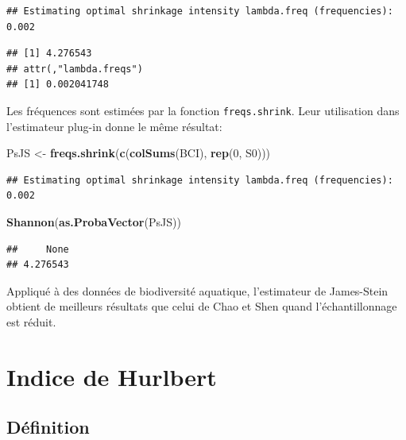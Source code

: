 \documentclass[
  11pt,
  french,
  a4paper,
  extrafontsizes,onecolumn,openright
  ]{memoir}
\newenvironment{Shaded}{\begin{snugshade}}{\end{snugshade}}
\newcommand{\DecValTok}[1]{\textcolor[rgb]{0.00,0.00,0.81}{#1}}
\newcommand{\KeywordTok}[1]{\textcolor[rgb]{0.13,0.29,0.53}{\textbf{#1}}}
\newcommand{\NormalTok}[1]{#1}
\newcommand{\StringTok}[1]{\textcolor[rgb]{0.31,0.60,0.02}{#1}}
\begin{document}
\begin{verbatim}
## Estimating optimal shrinkage intensity lambda.freq (frequencies): 0.002
\end{verbatim}

\begin{verbatim}
## [1] 4.276543
## attr(,"lambda.freqs")
## [1] 0.002041748
\end{verbatim}

\normalsize

Les fréquences sont estimées par la fonction \texttt{freqs.shrink}.
Leur utilisation dans l'estimateur plug-in donne le même résultat:

\scriptsize

\begin{Shaded}
\begin{Highlighting}[]
\NormalTok{PsJS <-}\StringTok{ }\KeywordTok{freqs.shrink}\NormalTok{(}\KeywordTok{c}\NormalTok{(}\KeywordTok{colSums}\NormalTok{(BCI), }\KeywordTok{rep}\NormalTok{(}\DecValTok{0}\NormalTok{, S0)))}
\end{Highlighting}
\end{Shaded}

\begin{verbatim}
## Estimating optimal shrinkage intensity lambda.freq (frequencies): 0.002
\end{verbatim}

\begin{Shaded}
\begin{Highlighting}[]
\KeywordTok{Shannon}\NormalTok{(}\KeywordTok{as.ProbaVector}\NormalTok{(PsJS))}
\end{Highlighting}
\end{Shaded}

\begin{verbatim}
##     None 
## 4.276543
\end{verbatim}

\normalsize

Appliqué à des données de biodiversité aquatique, l'estimateur de James-Stein obtient de meilleurs résultats que celui de Chao et Shen \autocite{Liu2015} quand l'échantillonnage est réduit.

\hypertarget{sec-Hurlbert}{%
\section{Indice de Hurlbert}\label{sec-Hurlbert}}

\hypertarget{duxe9finition-2}{%
\subsection{Définition}\label{duxe9finition-2}}
\end{document}
